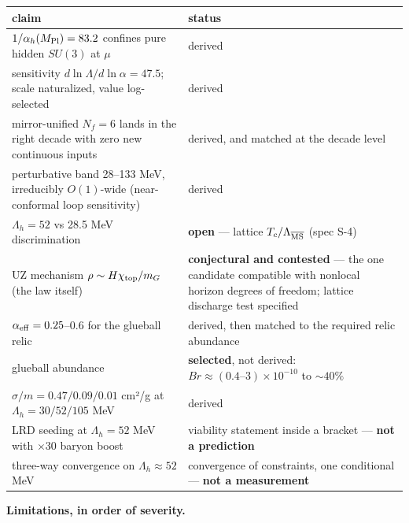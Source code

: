 \documentclass[preprint,12pt]{elsarticle}
\begin{document}
\begin{longtable}[]{@{}
  >{\raggedright\arraybackslash}p{}
  >{\raggedright\arraybackslash}p{}@{}}
\toprule\noalign{}
\begin{minipage}[b]{\linewidth}\raggedright
claim
\end{minipage} & \begin{minipage}[b]{\linewidth}\raggedright
status
\end{minipage} \\
\midrule\noalign{}
\endhead
\bottomrule\noalign{}
\endlastfoot
\(1/\alpha_h(M_{\rm Pl}) = 83.2\) confines pure hidden \(SU(3)\) at
\(\mu\) & derived \\
sensitivity \(d\ln\Lambda/d\ln\alpha = 47.5\); scale naturalized, value
log-selected & derived \\
mirror-unified \(N_f = 6\) lands in the right decade with zero new
continuous inputs & derived, and matched at the decade level \\
perturbative band 28--133 MeV, irreducibly \(O(1)\)-wide (near-conformal
loop sensitivity) & derived \\
\(\Lambda_h = 52\) vs 28.5 MeV discrimination & \textbf{open} ---
lattice \(T_c/\Lambda_{\overline{\rm MS}}\) (spec S-4) \\
UZ mechanism \(\rho \sim H\chi_{\rm top}/m_G\) (the law itself) &
\textbf{conjectural and contested} --- the one candidate compatible with
nonlocal horizon degrees of freedom; lattice discharge test specified \\
\(\alpha_{\rm eff} = 0.25\)--0.6 for the glueball relic & derived, then
matched to the required relic abundance \\
glueball abundance & \textbf{selected}, not derived:
\(Br \approx (0.4\text{–}3)\times10^{-10}\) to \(\sim 40\%\) \\
\(\sigma/m = 0.47/0.09/0.01\) cm²/g at \(\Lambda_h = 30/52/105\) MeV &
derived \\
LRD seeding at \(\Lambda_h = 52\) MeV with \(\times 30\) baryon boost &
viability statement inside a bracket --- \textbf{not a prediction} \\
three-way convergence on \(\Lambda_h \approx 52\) MeV & convergence of
constraints, one conditional --- \textbf{not a measurement} \\
\end{longtable}

\textbf{Limitations, in order of severity.}
\end{document}
